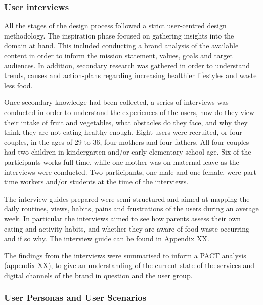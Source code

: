 \vspace{2,5mm} %

    \subsubsection{User interviews}
    
   All the stages of the design process followed a strict user-centred design methodology. The inspiration phase focused on gathering insights into the domain at hand. This included conducting a brand analysis of the available content in order to inform the mission statement, values, goals and target audiences. In addition, secondary research was gathered in order to understand trends, causes and action-plans regarding increasing healthier lifestyles and waste less food.
   
   Once secondary knowledge had been collected, a series of interviews was conducted in order to understand the experiences of the users, how do they view their intake of fruit and vegetables, what obstacles do they face, and why they think they are not eating healthy enough. Eight users were recruited, or four couples, in the ages of 29 to 36, four mothers and four fathers. All four couples had two children in kindergarten and/or early elementary school age. Six of the participants works full time, while one mother was on maternal leave as the interviews were conducted. Two participants, one male and one female, were part-time workers and/or students at the time of the interviews.
   
   The interview guides prepared were semi-structured and aimed at mapping the daily routines, views, habits, pains and frustrations of the users during an average week. In particular the interviews aimed to see how parents assess their own eating and activity habits, and whether they are aware of food waste occurring and if so why. The interview guide can be found in Appendix XX. 
   
   The findings from the interviews were summarised to inform a PACT analysis (appendix XX), to give an understanding of the current state of the services and digital channels of the brand in question and the user group.

\vspace{2,5mm} %

    \subsubsection{User Personas and User Scenarios}
    
